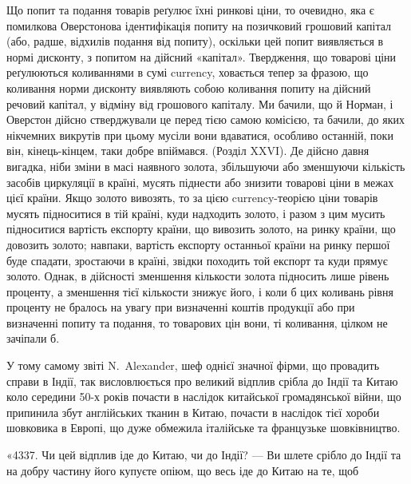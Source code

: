 Що попит та подання товарів реґулює їхні ринкові ціни, то очевидно, яка
є помилкова Оверстонова ідентифікація попиту на позичковий грошовий капітал
(або, радше, відхилів подання від попиту), оскільки цей попит виявляється
в нормі дисконту, з попитом на дійсний «капітал». Твердження, що товарові
ціни реґулюються коливаннями в сумі currency, ховається тепер за фразою, що
коливання норми дисконту виявляють собою коливання попиту на дійсний речовий
капітал, у відміну від грошового капіталу. Ми бачили, що й Норман, і
Оверстон дійсно стверджували це перед тією самою комісією, та бачили, до яких
нікчемних викрутів при цьому мусіли вони вдаватися, особливо останній, поки
він, кінець-кінцем, таки добре впіймався. (Розділ XXVI). Де дійсно давня вигадка,
ніби зміни в масі наявного золота, збільшуючи або зменшуючи кількість
засобів циркуляції в країні, мусять піднести або знизити товарові ціни в межах
цієї країни. Якщо золото вивозять, то за цією currency-теорією ціни товарів
мусять підноситися в тій країні, куди надходить золото, і разом з цим мусить
підноситися вартість експорту країни, що вивозить золото, на ринку країни, що
довозить золото; навпаки, вартість експорту останньої країни на ринку першої
буде спадати, зростаючи в країні, звідки походить той експорт та куди прямує
золото. Однак, в дійсності зменшення кількости золота підносить лише рівень проценту,
а зменшення тієї кількости знижує його, і коли б цих коливань рівня проценту
не бралось на увагу при визначенні коштів продукції або при визначенні
попиту та подання, то товарових цін вони, ті коливання, цілком не зачіпали б.

У тому самому звіті N.~Alexander, шеф однієї значної фірми, що провадить
справи в Індії, так висловлюється про великий відплив срібла до Індії та Китаю
коло середини 50-х років почасти в наслідок китайської громадянської війни, що
припинила збут англійських тканин в Китаю, почасти в наслідок тієї хороби
шовковика в Европі, що дуже обмежила італійське та французьке шовківництво.

«4337. Чи цей відплив іде до Китаю, чи до Індії? — Ви шлете срібло до
Індії та на добру частину його купуєте опіюм, що весь іде до Китаю на те, щоб
\parbreak{}  %
